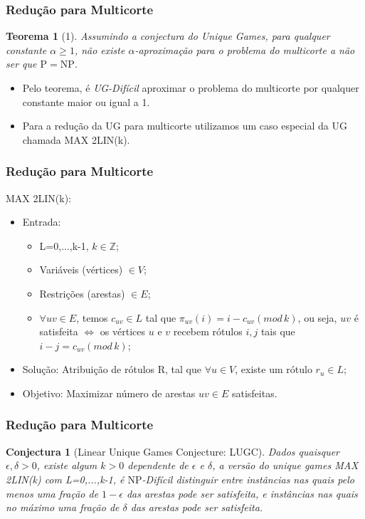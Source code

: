 \documentclass[11pt, handout]{beamer}
\newcommand{\pp}{\ensuremath{\mathrm{P}}\xspace}
\newcommand{\np}{\ensuremath{\mathrm{NP}}\xspace}
\newtheorem{conjectura}{Conjectura}
\newtheorem{teorema}{Teorema}
\begin{document}
\begin{frame}[<+->]
    \frametitle{Redução para Multicorte}
       \begin{teorema}[1] \label{multicut}
        Assumindo a conjectura do Unique Games, para qualquer constante $\alpha \ge 1$, não existe $\alpha$-aproximação para o problema do multicorte a não ser que $\pp = \np$.
        \end{teorema}
        \begin{itemize}
            \item Pelo teorema, é \emph{UG-Difícil} aproximar o problema do multicorte por qualquer constante maior ou igual a 1.
            
            \item Para a redução da UG para multicorte utilizamos um caso especial da UG chamada MAX 2LIN(k).
        \end{itemize}
\end{frame}{}

\begin{frame}[<+->]
    \frametitle{Redução para Multicorte}
        MAX 2LIN(k):
        \begin{itemize}
            \item Entrada:
            \begin{itemize}
                \item L={0,...,k-1}, $k \in \mathbb{Z}$;
                \item Variáveis (vértices) $\in V$;
                \item Restrições (arestas) $\in E$;
                \item $\forall uv \in E$, temos $c_{uv} \in L$ tal que $\pi_{uv}(i)=i-c_{uv}(mod\,k)$, ou seja, $uv$ é satisfeita $\iff$ os vértices $u$ e $v$ recebem rótulos $i,j$ tais que $i-j=c_{uv}(mod\,k)$;
              \end{itemize}
            \item Solução: Atribuição de rótulos R, tal que  $\forall u \in V$, existe um rótulo $r_u \in L$;
            \item Objetivo: Maximizar número de arestas $uv \in E$ satisfeitas.
        \end{itemize}
\end{frame}{}

\begin{frame}
    \frametitle{Redução para Multicorte}
        \begin{conjectura}[Linear Unique Games Conjecture: LUGC]
            Dados quaisquer $\epsilon,\delta>0$, existe algum $k>0$ dependente de  $\epsilon$ e $\delta$, a versão do unique games MAX 2LIN(k) com L={0,...,k-1}, é \emph{\np-Difícil} distinguir entre instâncias nas quais pelo menos uma fração de $1-\epsilon$ das arestas pode ser satisfeita, e instâncias nas quais no máximo uma fração de $\delta$ das arestas pode ser satisfeita.
        \end{conjectura}    
\end{frame}{}
\end{document}
